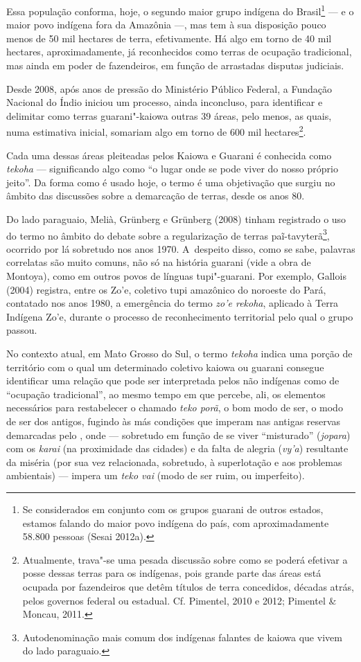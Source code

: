Essa população conforma, hoje, o segundo maior grupo indígena do
Brasil\footnote{Se considerados em conjunto com os grupos guarani de
outros estados, estamos falando do maior povo indígena do país, com
aproximadamente 58.800 pessoas (Sesai 2012a).} --- e o maior povo
indígena fora da Amazônia ---, mas tem à sua disposição pouco menos de 50
mil hectares de terra, efetivamente. Há algo em torno de 40 mil
hectares, aproximadamente, já reconhecidos como terras de ocupação
tradicional, mas ainda em poder de fazendeiros, em função de arrastadas
disputas judiciais. 

Desde 2008, após anos de pressão do Ministério Público Federal, a
Fundação Nacional do Índio iniciou um processo, ainda inconcluso, para
identificar e delimitar como terras guarani"-kaiowa outras 39 áreas,
pelo menos, as quais, numa estimativa inicial, somariam algo em torno
de 600 mil hectares\footnote{Atualmente, trava"-se uma pesada discussão
sobre como se poderá efetivar a posse dessas terras para os indígenas,
pois grande parte das áreas está ocupada por fazendeiros que detêm
títulos de terra concedidos, décadas atrás, pelos governos federal ou
estadual. Cf. Pimentel, 2010 e 2012; Pimentel \& Moncau, 2011.}. 

Cada uma dessas áreas pleiteadas pelos Kaiowa e Guarani é conhecida como
\emph{tekoha} --- significando algo como ``o lugar onde se pode viver do nosso
próprio jeito''. Da forma como é usado hoje, o termo é uma objetivação
que surgiu no âmbito das discussões sobre a demarcação de terras, desde
os anos 80. 

Do lado paraguaio, Melià, Grünberg e Grünberg (2008) tinham registrado o
uso do termo no âmbito do debate sobre a regularização de terras
paĩ{}-tavyterã\footnote{Autodenominação mais comum dos indígenas
falantes de kaiowa que vivem do lado paraguaio.}, ocorrido por lá
sobretudo nos anos 1970. A~despeito disso, como se sabe, palavras
correlatas são muito comuns, não só na história guarani (vide a obra de
Montoya), como em outros povos de línguas tupi"-guarani. Por exemplo,
Gallois (2004) registra, entre os Zo’e, coletivo tupi amazônico do
noroeste do Pará, contatado nos anos 1980, a emergência do termo \emph{zo’e
rekoha}, aplicado à Terra Indígena Zo’e, durante o processo de
reconhecimento territorial pelo qual o grupo passou. 

No contexto atual, em Mato Grosso do Sul, o termo \emph{tekoha} indica uma
porção de território com o qual um determinado coletivo kaiowa ou
guarani consegue identificar uma relação que pode ser interpretada
pelos não indígenas como de ``ocupação tradicional'', ao mesmo tempo em
que percebe, ali, os elementos necessários para restabelecer o chamado
\emph{teko porã}, o bom modo de ser, o modo de ser dos antigos, fugindo às más
condições que imperam nas antigas reservas demarcadas pelo , onde ---
sobretudo em função de se viver ``misturado'' (\emph{jopara}) com os \emph{karai} (na
proximidade das cidades) e da falta de alegria (\emph{vy’a}) resultante da
miséria (por sua vez relacionada, sobretudo, à superlotação e aos
problemas ambientais) --- impera um \emph{teko vai} (modo de ser ruim, ou
imperfeito).

